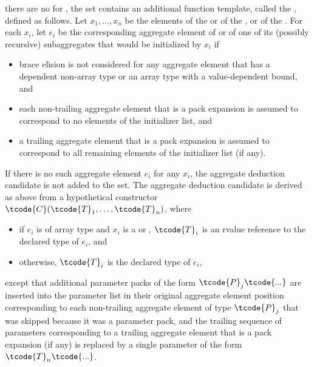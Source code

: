 there are no  for ,
the set contains an additional function template,
called the , defined as follows.
Let $x_1, \dotsc, x_n$ be the elements
of the  or
of the , or
of the .
For each $x_i$, let $e_i$ be the corresponding aggregate element
of  or of one of its (possibly recursive) subaggregates
that would be initialized by $x_i$ if
\begin{itemize}
\item
brace elision is not considered for any aggregate element
that has a dependent non-array type or
an array type with a value-dependent bound, and
\item
each non-trailing aggregate element that is a pack expansion
is assumed to correspond to no elements of the initializer list, and
\item
a trailing aggregate element that is a pack expansion is assumed to correspond
to all remaining elements of the initializer list (if any).
\end{itemize}
If there is no such aggregate element $e_i$ for any $x_i$,
the aggregate deduction candidate is not added to the set.
The aggregate deduction candidate is derived as above
from a hypothetical constructor $\tcode{C}(\tcode{T}_1, \dotsc, \tcode{T}_n)$,
where
\begin{itemize}
\item
if $e_i$ is of array type and
$x_i$ is a  or ,
$\tcode{T}_i$ is an rvalue reference to the declared type of $e_i$, and
\item
otherwise, $\tcode{T}_i$ is the declared type of $e_i$,
\end{itemize}
except that additional parameter packs of the form $\tcode{P}_j \tcode{...}$
are inserted into the parameter list in their original aggregate element position corresponding to each non-trailing aggregate element of type $\tcode{P}_j$
that was skipped because it was a parameter pack, and
the trailing sequence of parameters corresponding
to a trailing aggregate element that is a pack expansion (if any)
is replaced by a single parameter of the form $\tcode{T}_n \tcode{...}$.

